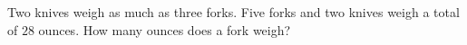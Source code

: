 Two knives weigh as much as three forks. Five forks and two knives weigh a total of $28$ ounces. How many ounces does a fork weigh?
